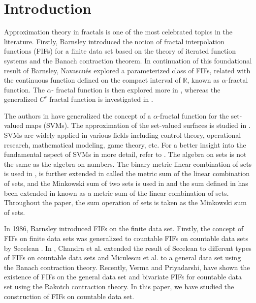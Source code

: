 \documentclass[12pt,oneside,reqno]{amsart}
\theoremstyle{definition}
\theoremstyle{remark}
\begin{document}
\maketitle





\section{Introduction}\label{section 1}
Approximation theory in fractals is one of the most celebrated topics in the literature. Firstly, Barnsley \cite{MF1} introduced the notion of fractal interpolation functions (FIFs) for a finite data set based on the theory of iterated function systems and the Banach contraction theorem. In continuation of this foundational result of Barnsley, Navascu\'es \cite{Navascues2010,Navascues2005} explored a parameterized class of FIFs, related with the continuous function defined on the compact interval of $\mathbb{R}$, known as $\alpha$-fractal function. The $\alpha$- fractal function is then explored more in \cite{JV1,sverma4, GCV1}, whereas the generalized $C^r$ fractal function is investigated in \cite{B,Massopust2016fractal,Navascues2004}.

The authors in \cite{Ver21} have generalized the concept of a $\alpha$-fractal function for the set-valued maps (SVMs). The approximation of the set-valued surfaces is studied in \cite{AV3}. SVMs are widely applied in various fields including control theory, operational research, mathematical modeling, game theory, etc. For a better insight into the fundamental aspect of SVMs in more detail, refer to \cite{levin}. The algebra on sets is not the same as the algebra on numbers. The binary metric linear combination of sets is used in \cite{Artstein}, is further extended in \cite{Berdysheva} called the metric sum of the linear combination of sets, and the Minkowski sum of two sets is used in \cite{Ndyn} and the sum defined in \cite{Artstein} has been extended in \cite{Berdysheva} known as a metric sum of the linear combination of sets. Throughout the paper, the sum operation of sets is taken as the Minkowski sum of sets.

In 1986, Barnsley \cite{MF1} introduced FIFs on the finite data set. 
Firstly, the concept of FIFs on finite data sets was generalized to countable FIFs \cite{Secelean} on countable data sets by Secelean \cite{Secelean2}. In \cite{CAV1}, Chandra et al. extended the result of Secelean \cite{Secelean2} to different types of FIFs on countable data sets and Miculescu et al. \cite{Miculescu} to a general data set using the Banach contraction theory. Recently, Verma and  Priyadarshi,\cite{Mverma1 , Mverma3} have shown the existence of FIFs on the general data set and bivariate FIFs for countable data set using the Rakotch contraction theory. In this paper, we have studied the construction of FIFs on countable data set. 
\end{document}
